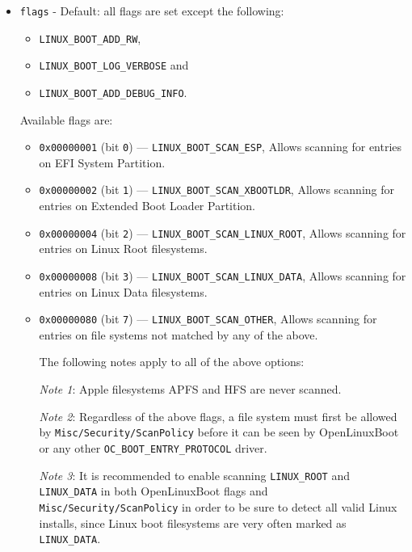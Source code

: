 \documentclass[]{article}
\providecommand{\tightlist}{%
  \setlength{\itemsep}{0pt}\setlength{\parskip}{0pt}}
\begin{document}
\begin{itemize}
\tightlist
  \item \texttt{flags} - Default: all flags are set except the following:
  \begin{itemize}
  \tightlist
    \item \texttt{LINUX\_BOOT\_ADD\_RW},
    \item \texttt{LINUX\_BOOT\_LOG\_VERBOSE} and
    \item \texttt{LINUX\_BOOT\_ADD\_DEBUG\_INFO}.
  \end{itemize}
  \medskip

  Available flags are: \medskip

  \begin{itemize}
  \tightlist
    \item \texttt{0x00000001} (bit \texttt{0}) --- \texttt{LINUX\_BOOT\_SCAN\_ESP},
    Allows scanning for entries on EFI System Partition.
    \item \texttt{0x00000002} (bit \texttt{1}) --- \texttt{LINUX\_BOOT\_SCAN\_XBOOTLDR},
    Allows scanning for entries on Extended Boot Loader Partition.
    \item \texttt{0x00000004} (bit \texttt{2}) --- \texttt{LINUX\_BOOT\_SCAN\_LINUX\_ROOT},
    Allows scanning for entries on Linux Root filesystems.
    \item \texttt{0x00000008} (bit \texttt{3}) --- \texttt{LINUX\_BOOT\_SCAN\_LINUX\_DATA},
    Allows scanning for entries on Linux Data filesystems.
    \item \texttt{0x00000080} (bit \texttt{7}) --- \texttt{LINUX\_BOOT\_SCAN\_OTHER},
    Allows scanning for entries on file systems not matched by any of the above. \medskip

    The following notes apply to all of the above options: \medskip

    \emph{Note 1}: Apple filesystems APFS and HFS are never scanned.
    \medskip

    \emph{Note 2}: Regardless of the above flags, a file system must first be
    allowed by \texttt{Misc/Security/ScanPolicy} before it can be seen by
    OpenLinuxBoot or any other \texttt{OC\_BOOT\_ENTRY\_PROTOCOL} driver.
    \medskip

    \emph{Note 3}: It is recommended to enable scanning \texttt{LINUX\_ROOT} and \texttt{LINUX\_DATA}
    in both OpenLinuxBoot flags and \texttt{Misc/Security/ScanPolicy} in order to be sure to detect
    all valid Linux installs, since Linux boot filesystems are very often marked as \texttt{LINUX\_DATA}.
    \medskip


\end{itemize}
\end{itemize}
\end{document}
